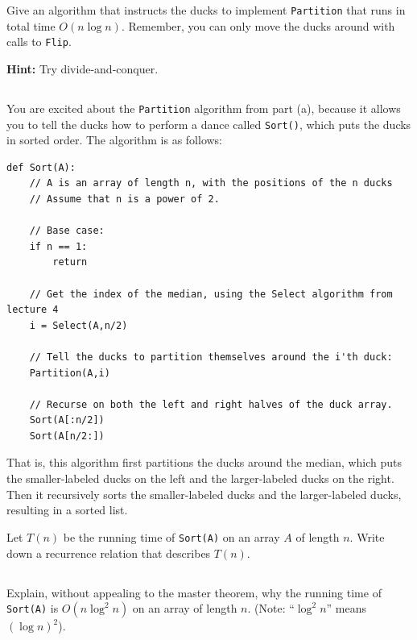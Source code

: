 \documentclass[12pt]{article}
\begin{document}
Give an algorithm that instructs the ducks to implement \texttt{Partition} that runs in total time $O(n \log n)$. Remember, you can only move the ducks around with calls to \texttt{Flip}. 

\textbf{Hint:} Try divide-and-conquer.


\subsection {} 
You are excited about the \texttt{Partition} algorithm from part (a), because it allows you to tell the ducks how to perform a dance called \texttt{Sort()}, which puts the ducks in sorted order.  The algorithm is as follows:

\begin{verbatim}
def Sort(A):
    // A is an array of length n, with the positions of the n ducks
    // Assume that n is a power of 2.

    // Base case:
    if n == 1:
        return
 
    // Get the index of the median, using the Select algorithm from lecture 4
    i = Select(A,n/2)

    // Tell the ducks to partition themselves around the i'th duck:
    Partition(A,i)

    // Recurse on both the left and right halves of the duck array.
    Sort(A[:n/2])
    Sort(A[n/2:])
\end{verbatim}

That is, this algorithm first partitions the ducks around the median, which puts the smaller-labeled ducks on the left and the larger-labeled ducks on the right.  Then it recursively sorts the smaller-labeled ducks and the larger-labeled ducks, resulting in a sorted list.

Let $T(n)$ be the running time of \texttt{Sort(A)} on an array $A$ of length $n$.  Write down a recurrence relation that describes $T(n)$.


\subsection {}  Explain, without appealing to the master theorem, why the running time of \texttt{Sort(A)} is $O(n \log^2 n)$ on an array of length $n$.  (Note: ``$\log^2n$'' means $(\log n)^2$).  
\end{document}
